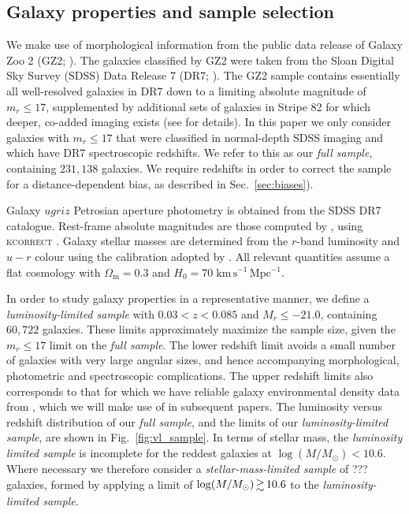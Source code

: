\documentclass[useAMS,usenatbib]{mn2e}
\begin{document}
\subsection{Galaxy properties and sample selection}

We make use of morphological information from the public data release of Galaxy Zoo 2 (GZ2; \citealt{Willett_13}). The galaxies classified by GZ2 were taken from the Sloan Digital Sky Survey (SDSS) Data Release 7 (DR7; \citealt{Abazijian_09}). The GZ2 sample contains essentially all well-resolved galaxies in DR7 down to a limiting absolute magnitude of $m_r \leq 17$, supplemented by additional sets of galaxies in Stripe 82 for which deeper, co-added imaging exists (see \citealt{Willett_13} for details).  In this paper we only consider galaxies with $m_r \leq 17$ that were classified in normal-depth SDSS imaging and which have DR7 spectroscopic redshifts. We refer to this as our \textit{full sample}, containing $231,138$ galaxies.  We require redshifts in order to correct the sample for a distance-dependent bias, as described in Sec.~\ref{sec:biases}).

Galaxy $ugriz$ Petrosian aperture photometry is obtained from the SDSS DR7 catalogue. Rest-frame absolute magnitudes are those computed by \citet{Bamford_09}, using \textsc{kcorrect} \citep{kcorrect}. Galaxy stellar masses are determined from the $r$-band luminosity and $u-r$ colour using the calibration adopted by \citet{Baldry_06}.
All relevant quantities assume a flat cosmology with $\Omega_\mathrm{m} = 0.3$ and $H_0 = 70\;\mathrm{km\,s^{-1}\,Mpc^{-1}}$.

In order to study galaxy properties in a representative manner, we define a \textit{luminosity-limited sample} with $0.03<z<0.085$ and $M_r \le -21.0$, containing $60,722$ galaxies.  These limits approximately maximize the sample size, given the $m_r \le 17$ limit on the \textit{full sample}. The lower redshift limit avoids a small number of galaxies with very large angular sizes, and hence accompanying morphological, photometric and spectroscopic complications. The upper redshift limits also corresponds to that for which we have reliable galaxy environmental density data from \cite{Baldry_06}, which we will make use of in subsequent papers.  The luminosity versus redshift distribution of our \textit{full sample}, and the limits of our \textit{luminosity-limited sample}, are shown in Fig.~\ref{fig:vl_sample}.
In terms of stellar mass, the \textit{luminosity limited sample} is incomplete for the reddest galaxies at $\log (M/M_{\odot}) < 10.6$. Where necessary we therefore consider a \textit{stellar-mass-limited sample} of ??? galaxies, formed by applying a limit of $\log (M/M_{\odot}) \ga 10.6$ to the \textit{luminosity-limited sample}.
\end{document}
